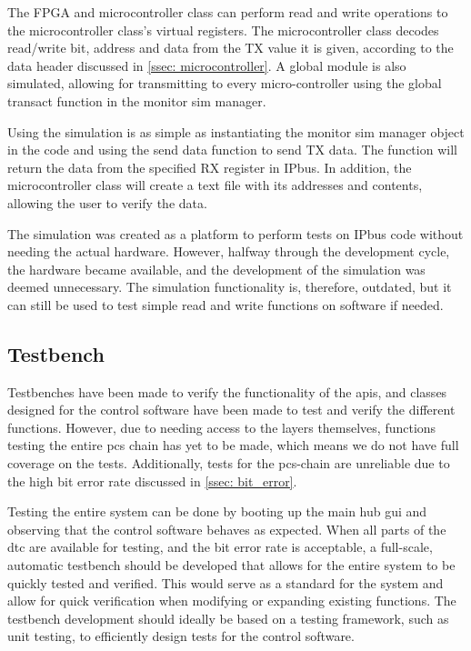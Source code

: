 \documentclass[main.tex]{subfiles}
\begin{document}
The FPGA and microcontroller class can perform read and write operations to the microcontroller class's virtual registers. The microcontroller class decodes read/write bit, address and data from the TX value it is given, according to the data header discussed in \autoref{ssec: microcontroller}. A global module is also simulated, allowing for transmitting to every micro-controller using the global transact function in the monitor sim manager. 

Using the simulation is as simple as instantiating the monitor sim manager object in the code and using the send data function to send TX data. The function will return the data from the specified RX register in IPbus. In addition, the microcontroller class will create a text file with its addresses and contents, allowing the user to verify the data.

The simulation was created as a platform to perform tests on IPbus code without needing the actual hardware. However, halfway through the development cycle, the hardware became available, and the development of the simulation was deemed unnecessary. The simulation functionality is, therefore, outdated, but it can still be used to test simple read and write functions on software if needed.


\subsection{Testbench}

Testbenches have been made to verify the functionality of the \gls{api}s, and classes designed for the control software have been made to test and verify the different functions. However, due to needing access to the layers themselves, functions testing the entire \gls{pcs} chain has yet to be made, which means we do not have full coverage on the tests. Additionally, tests for the \gls{pcs}-chain are unreliable due to the high bit error rate discussed in \autoref{ssec: bit_error}.

Testing the entire system can be done by booting up the main hub \gls{gui} and observing that the control software behaves as expected. When all parts of the \gls{dtc} are available for testing, and the bit error rate is acceptable, a full-scale, automatic testbench should be developed that allows for the entire system to be quickly tested and verified. This would serve as a standard for the system and allow for quick verification when modifying or expanding existing functions. The testbench development should ideally be based on a testing framework, such as unit testing\cite{unit_test}, to efficiently design tests for the control software.
\end{document}
